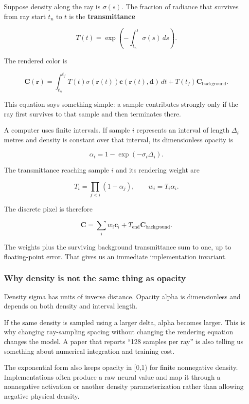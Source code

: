 Suppose density along the ray is \(\sigma(s)\). The fraction of radiance that survives from ray start \(t_n\) to \(t\) is the \textbf{transmittance}

\[T(t)=\exp\left(-\int_{t_n}^{t}\sigma(s)\,ds\right).\]

The rendered color is

\[\mathbf C(\mathbf r)=\int_{t_n}^{t_f}T(t)\sigma(\mathbf r(t))\mathbf c(\mathbf r(t),\mathbf d)\,dt+T(t_f)\mathbf C_{\mathrm{background}}.\]

This equation says something simple: a sample contributes strongly only if the ray first survives to that sample and then terminates there.

A computer uses finite intervals. If sample \(i\) represents an interval of length \(\Delta_i\) metres and density is constant over that interval, its dimensionless opacity is

\[\alpha_i=1-\exp(-\sigma_i\Delta_i).\]

The transmittance reaching sample \(i\) and its rendering weight are

\[T_i=\prod_{j<i}(1-\alpha_j),\qquad w_i=T_i\alpha_i.\]

The discrete pixel is therefore

\[\mathbf C=\sum_iw_i\mathbf c_i+T_{\mathrm{end}}\mathbf C_{\mathrm{background}}.\]

The weights plus the surviving background transmittance sum to one, up to floating-point error. That gives us an immediate implementation invariant.

\subsubsection{Why density is not the same thing as opacity}\label{why-density-is-not-the-same-thing-as-opacity}

Density sigma has units of inverse distance. Opacity alpha is dimensionless and depends on both density and interval length.

If the same density is sampled using a larger delta, alpha becomes larger. This is why changing ray-sampling spacing without changing the rendering equation changes the model. A paper that reports ``128 samples per ray'' is also telling us something about numerical integration and training cost.

The exponential form also keeps opacity in {[}0,1) for finite nonnegative density. Implementations often produce a raw neural value and map it through a nonnegative activation or another density parameterization rather than allowing negative physical density.

